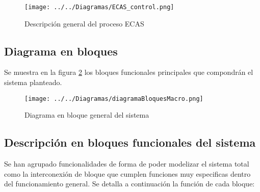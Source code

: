 \documentclass[12pt]{article}
\begin{document}
  \begin{figure}[h!]
      \centering
      \texttt{[image: ../../Diagramas/ECAS\_control.png]}
       \caption{Descripción general del proceso ECAS}
      \label{fig:ECAS control}
  \end{figure}

  \newpage

  \subsection{Diagrama en bloques}

    Se muestra en la figura \ref{fig:DiagramaBloqueGeneral} los bloques funcionales principales que compondrán el sistema planteado.
  
    \begin{figure}[h!]
      \centering
      \texttt{[image: ../../Diagramas/diagramaBloquesMacro.png]}
      \caption{Diagrama en bloque general del sistema}
      \label{fig:DiagramaBloqueGeneral}
    \end{figure}

  \newpage

  \subsection{Descripción en bloques funcionales del sistema}    
  
  Se han agrupado funcionalidades de forma de poder modelizar el sistema total como la interconexión de bloque que cumplen funciones muy especificas
  dentro del funcionamiento general. Se detalla a continuación la función de cada bloque:
\end{document}
